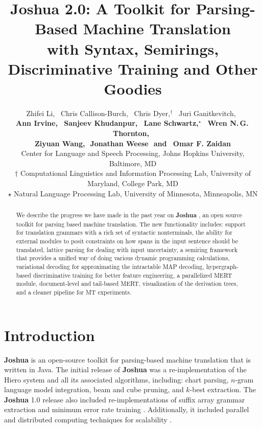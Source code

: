 \documentclass[11pt]{article}
\title{Joshua 2.0: A Toolkit for Parsing-Based Machine Translation \\with Syntax, Semirings, Discriminative Training and Other Goodies }
\author{
Zhifei Li,\,\,\,
Chris Callison-Burch,\,\,\,
Chris Dyer,$^\dagger$\,\,\,
Juri Ganitkevitch,\,\,\,
\\ {\bf
Ann Irvine,\,\,\,  
Sanjeev Khudanpur,\,\,\,
Lane Schwartz,$^\star$\,\,\, 
Wren N.\,G.\,Thornton,\,\,\,}
\\ {\bf
Ziyuan Wang,\,\,
Jonathan Weese\,\,
{\textnormal{and}}
\,\,\,Omar F. Zaidan
}\\
Center for Language and Speech Processing, Johns Hopkins University, Baltimore, MD\\
$\dagger$ Computational Linguistics and Information Processing Lab, University of Maryland, College Park, MD\\
$\star$ Natural Language Processing Lab, University of Minnesota, Minneapolis, MN }
\date{}
\newcommand{\joshua}{\textbf{Joshua}\xspace}
\begin{document}
\maketitle
\begin{abstract}
We describe the progress we have made in the past year on \textbf{Joshua} \cite{joshua-wmt09}, 
an open source toolkit for parsing based machine translation.
The new functionality includes: 
support for translation grammars with a rich set of syntactic nonterminals,
the ability for external modules to posit constraints on how spans in the input sentence should be translated,  
lattice parsing for dealing with input uncertainty,
a semiring framework that provides a unified way of doing various dynamic programming calculations, 
variational decoding for approximating the intractable MAP decoding,
hypergraph-based discriminative training for better feature engineering, 
a parallelized MERT module,
document-level and tail-based MERT,
visualization of the derivation trees, 
and a cleaner pipeline for MT experiments.
\end{abstract}



\section{Introduction}

\joshua is an open-source toolkit for parsing-based machine
translation that is written in Java. The initial release of \joshua
\cite{joshua-wmt09} was a re-implementation of the Hiero system
\cite{hiero-2007} and all its associated algorithms, including: chart
parsing, $n$-gram language model integration, beam and cube pruning,
and $k$-best extraction.  The \joshua 1.0 release also included
re-implementations of suffix array grammar extraction
\cite{lopez:2007:EMNLP-CoNLL2007,PBML-2010-Joshua-grammar-extraction}
and minimum error rate training \cite{och-mert,Zaidan2009}.
Additionally, it included parallel and distributed computing
techniques for scalability \cite{Joshua-old}.
\end{document}
